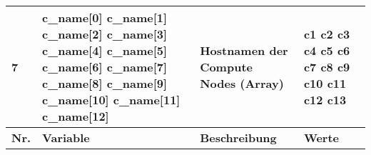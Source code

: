 \begin{longtable}{| p{0.5cm} | p{3cm} | p{8.5cm} | p{4cm} |}
7 &  c\_name[0] \newline  c\_name[1] \newline c\_name[2] \newline c\_name[3] \newline c\_name[4] \newline c\_name[5] \newline c\_name[6] \newline c\_name[7] \newline c\_name[8] \newline c\_name[9] \newline c\_name[10] \newline c\_name[11] \newline c\_name[12]  & Hostnamen der Compute Nodes (Array) & c1 \newline c2 \newline c3 \newline c4 \newline c5 \newline c6 \newline c7 \newline c8 \newline c9 \newline c10 \newline c11 \newline c12 \newline c13 \\\hline 
\rowcolor{heading} \textbf{Nr.} & \textbf{Variable} & \textbf{Beschreibung} &\textbf{Werte} \\\hline

\end{longtable}
